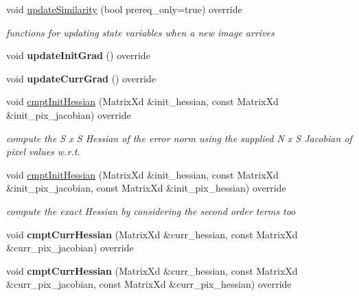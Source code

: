 \begin{DoxyCompactItemize}
\item 
void \hyperlink{classSPSS_a1a7a1a7cfce732222c3128f105e58bd3}{update\-Similarity} (bool prereq\-\_\-only=true) override
\begin{DoxyCompactList}\small\item\em functions for updating state variables when a new image arrives \end{DoxyCompactList}\item 
\hypertarget{classSPSS_acac568057b0f9ba9ffb08cefe518fa02}{void {\bfseries update\-Init\-Grad} () override}\label{classSPSS_acac568057b0f9ba9ffb08cefe518fa02}

\item 
\hypertarget{classSPSS_a6f6eee7f99a3844876f71f34a58ef727}{void {\bfseries update\-Curr\-Grad} () override}\label{classSPSS_a6f6eee7f99a3844876f71f34a58ef727}

\item 
void \hyperlink{classSPSS_a9f901d6ccc104d961d9b67929eaf6898}{cmpt\-Init\-Hessian} (Matrix\-Xd \&init\-\_\-hessian, const Matrix\-Xd \&init\-\_\-pix\-\_\-jacobian) override
\begin{DoxyCompactList}\small\item\em compute the S x S Hessian of the error norm using the supplied N x S Jacobian of pixel values w.\-r.\-t. \end{DoxyCompactList}\item 
\hypertarget{classSPSS_a96a8dd68371bc004806fe7edc0e5ceb2}{void \hyperlink{classSPSS_a96a8dd68371bc004806fe7edc0e5ceb2}{cmpt\-Init\-Hessian} (Matrix\-Xd \&init\-\_\-hessian, const Matrix\-Xd \&init\-\_\-pix\-\_\-jacobian, const Matrix\-Xd \&init\-\_\-pix\-\_\-hessian) override}\label{classSPSS_a96a8dd68371bc004806fe7edc0e5ceb2}

\begin{DoxyCompactList}\small\item\em compute the exact Hessian by considering the second order terms too \end{DoxyCompactList}\item 
\hypertarget{classSPSS_a18e614891f04f713b53871d28fbaec6e}{void {\bfseries cmpt\-Curr\-Hessian} (Matrix\-Xd \&curr\-\_\-hessian, const Matrix\-Xd \&curr\-\_\-pix\-\_\-jacobian) override}\label{classSPSS_a18e614891f04f713b53871d28fbaec6e}

\item 
\hypertarget{classSPSS_aa44ca47ee2625b008e9af24836b05a13}{void {\bfseries cmpt\-Curr\-Hessian} (Matrix\-Xd \&curr\-\_\-hessian, const Matrix\-Xd \&curr\-\_\-pix\-\_\-jacobian, const Matrix\-Xd \&curr\-\_\-pix\-\_\-hessian) override}\label{classSPSS_aa44ca47ee2625b008e9af24836b05a13}


\end{DoxyCompactItemize}
